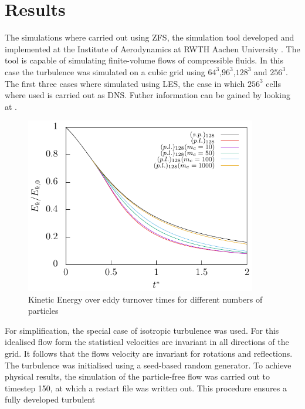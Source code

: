 \documentclass[11pt,a4paper,openany,oneside,parskip=half*]{article}
\begin{document}
\section{Results}
The simulations where carried out using ZFS, the simulation tool developed and implemented at the Institute of Aerodynamics at RWTH Aachen University 
\cite{anAdaptiveMultilevelMultigridFormulationForCartesianHierarchicalGridMethods} \cite{aStrictlyConservativeCartesianCutCellMethodForCompressibleViscousFlowsOnAdaptiveGrids}. 
The tool is capable of simulating finite-volume flows of compressible fluids. 
In this case the turbulence was simulated on a cubic grid using $64^3$,$96^3$,$128^3$ and $256^3$. The first three cases where simulated using LES, 
the case in which $256^3$ cells where used is carried out as DNS. Futher information can be gained by looking at \cite[p.344-357 for DNS and p. 558-639 for LES]{turbulentFlows}.
\begin{figure}[h]
	\centering
  \includegraphics[width=0.9\textwidth]{./../Simulationsergebnisse/variationWolken/128/kineticEnergy_time.pdf}
	\caption{Kinetic Energy over eddy turnover times for different numbers of particles}
	\label{kineticEnergy_time_128}
\end{figure}
\newline
For simplification, the special case of isotropic turbulence was used. For this idealised flow form the statistical 
velocities are invariant in all directions of the grid. It follows that the flows velocity are invariant for rotations and reflections. 
The turbulence was initialised using a seed-based random generator. To achieve physical results, the simulation of the particle-free flow was carried out  to timestep 150, 
at which a restart file was written out. This procedure ensures a fully developed turbulent 
\end{document}
